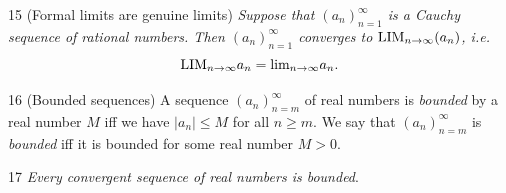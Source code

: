 \begin{proposition}{15}
    \label{formal-limit-is-limit}
    (Formal limits are genuine limits) \emph{Suppose that $(a_n)_{n=1}^{\infty}$
    is a Cauchy sequence
    of rational numbers. Then $(a_n)_{n=1}^{\infty}$ converges
    to $\text{LIM}_{n \rightarrow \infty}{(}a_n)$, i.e.
    \begin{equation*}
        \text{LIM}_{n \rightarrow \infty}{a_n} = \text{lim}_{n \rightarrow \infty}{a_n}.
    \end{equation*}
    }
\end{proposition}

\begin{definition}{16}
    \label{real-bounded-sequence}
    (Bounded sequences) A sequence $(a_n)_{n=m}^{\infty}$ of real numbers is
    \emph{bounded} by a real number $M$ iff we have $|a_n| \leq M$
    for all $n \geq m$. We say that $(a_n)_{n=m}^{\infty}$ is \emph{bounded} iff
    it is bounded for some real number $M > 0$.
\end{definition}

\begin{corollary}{17}
    \label{convergent-bounded}
    \emph{Every convergent sequence of real numbers is bounded}.
\end{corollary}


